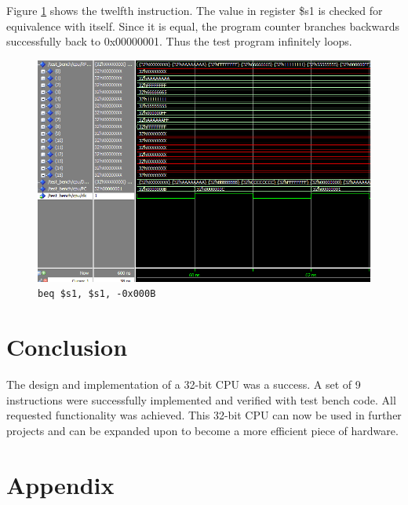 \documentclass[12pt]{article}
\begin{document}
Figure \ref{fig:12-instr} shows the twelfth instruction. The value in register \$s1 is checked for equivalence with itself. Since it is equal, the program counter branches backwards successfully back to 0x00000001. Thus the test program infinitely loops. 
\begin{figure}[H]
\centering
\includegraphics[width=\linewidth]{simulation/12-instr}
\caption{\texttt{beq \$s1, \$s1, -0x000B}}
\label{fig:12-instr}
\end{figure}


\section{Conclusion}
The design and implementation of a 32-bit CPU was a success. A set of 9 instructions were successfully implemented and verified with test bench code. All requested functionality was achieved. This 32-bit CPU can now be used in further projects and can be expanded upon to become a more efficient piece of hardware.
\newpage
\section*{Appendix}

\label{code:tbCode}
\end{document}
